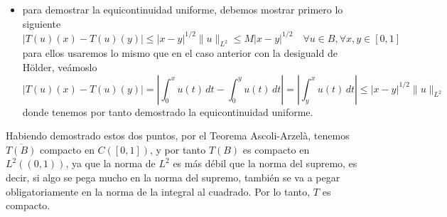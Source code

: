 \begin{ejercicio}
\begin{description}
\begin{itemize}
            donde en $(*)$ hemos usado la desigualdad de Hölder, y en $(**)$ es, por definición, menor o igual que la norma completa de la función en todo el intervalo. Tenemos aplicado esto a todo $x\in [0,1]$ lo siguiente
            \begin{equation*}
                \|T(u)\|_\infty = \max_{x \in [0,1]} |T(u(x))| \leq \max_{x \in [0,1]} \|u\|_{L^2} = \|u\|_{L^2} \quad \forall u \in B
            \end{equation*}
            y recordando la ecuacion \ref{eq:acotacion-uniforme}, entonces tenemos 
            \begin{equation*}
                \|T(u)\|_\infty \leq \|u\|_{L^2}\leq M \quad \forall u \in B
            \end{equation*}
            y se tiene la acotación uniforme, es decir, $T(B)$ está acotado en $C([0,1])$.
            \item {} para demostrar la equicontinuidad uniforme, debemos mostrar primero lo siguiente
            $$|T(u)(x) - T(u)(y)| \leq |x - y|^{1/2} \|u\|_{L^2} \leq M|x - y|^{1/2} \quad \forall u \in B, \forall x,y \in [0,1]$$
            para ellos usaremos lo mismo que en el caso anterior con la desiguald de Hölder, veámoslo
            \begin{equation*}
                |T(u)(x) - T(u)(y)| = \left| \int_{0}^{x} u(t) \, dt - \int_{0}^{y} u(t) \, dt \right| = \left| \int_{y}^{x} u(t) \, dt \right| \leq |x - y|^{1/2} \|u\|_{L^2}
            \end{equation*}
            donde tenemos por tanto demostrado la equicontinuidad uniforme.
        \end{itemize}
        Habiendo demostrado estos dos puntos, por el Teorema Ascoli-Arzelà, tenemos $\overline{T(B)}$ compacto en $C([0,1])$, y por tanto $T(B)$ es compacto en $L^2((0,1))$, ya que la norma de $L^2$ es más débil que la norma del supremo, es decir, si algo se pega mucho en la norma del supremo, también se va a pegar obligatoriamente en la norma de la integral al cuadrado. Por lo tanto, $T$ es compacto.


\end{description}
\end{ejercicio}
